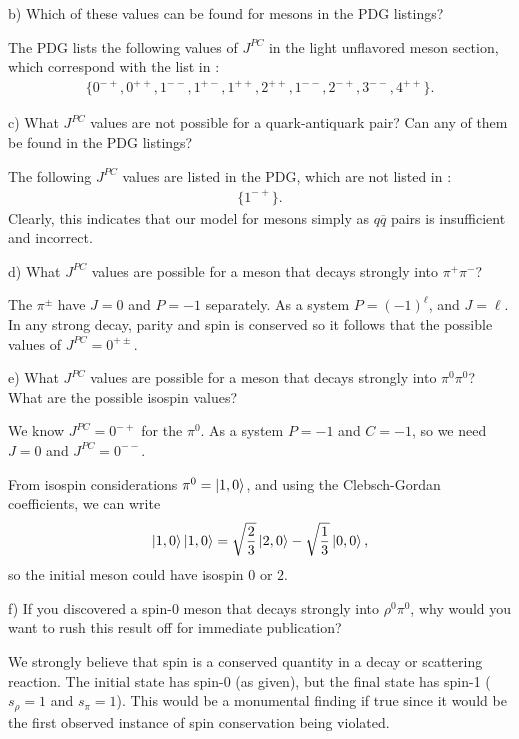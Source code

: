 b) Which of these values can be found for mesons in the PDG listings? 

The PDG lists the following values of $J^{PC}$ in the light unflavored meson section, which correspond with the list in :
\begin{align}
    \label{eq:JPC-PDG}
    \{ 0^{-+}, 0^{++}, 1^{--}, 1^{+-}, 1^{++}, 2^{++}, 1^{--}, 2^{-+}, 3^{--}, 4^{++} \} 
.\end{align}


c) What $J^{PC}$ values are not possible for a quark-antiquark pair?
Can any of them be found in the PDG listings?

The following $J^{PC}$ values are listed in the PDG, which are not listed in :
\begin{eqnarray}
    \label{eq:JPC-forbidden}
    \{ 1^{-+} \}  
.\end{eqnarray}
Clearly, this indicates that our model for mesons simply as $q\overline{q}$ pairs is insufficient and incorrect.

d) What $J^{PC}$ values are possible for a meson that decays strongly into $\pi^{+}\pi^{-}$?

The $\pi^{\pm}$ have $J = 0$ and $P = -1$ separately.
As a system $P = (-1)^{\ell}$, and $J = \ell$.
In any strong decay, parity and spin is conserved so it follows that the possible values of $J^{PC} = 0^{+\pm}$.

e) What $J^{PC}$ values are possible for a meson that decays strongly into $\pi^{0}\pi^{0}$?
What are the possible isospin values?

We know $J^{PC} = 0^{-+}$ for the $\pi^{0}$.
As a system $P = -1$ and $C = -1$, so we need $J = 0$ and $J^{PC} = 0^{--}$.

From isospin considerations $\pi^{0} = \ket{1,0}$, and using the Clebsch-Gordan coefficients, we can write
\begin{eqnarray}
    \label{eq:isospin-CG}
    \ket{1,0}\ket{1,0} = \sqrt{\frac{2}{3}}\ket{2,0} - \sqrt{\frac{1}{3}}\ket{0,0}
,\end{eqnarray}
so the initial meson could have isospin $0$ or $2$.

f) If you discovered a spin-0 meson that decays strongly into $\rho^{0}\pi^{0}$, why would you want to rush this result off for immediate publication?

We strongly believe that spin is a conserved quantity in a decay or scattering reaction.
The initial state has spin-0 (as given), but the final state has spin-1 ($s_{\rho} = 1$ and $s_{\pi} = 1$).
This would be a monumental finding if true since it would be the first observed instance of spin conservation being violated. 

